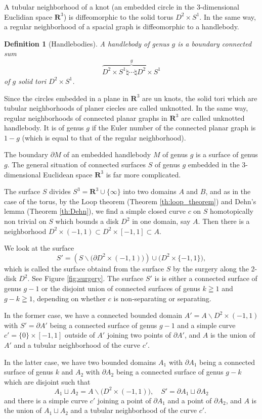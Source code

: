 \documentclass{amsart}
\newtheorem{definition}[theorem]{Definition}
\numberwithin{equation}{section}
\newcommand{\RR}{{\boldsymbol{R}}}
\newcommand{\bd}{\partial}
\newcommand{\ssm}{\smallsetminus}
\begin{document}
A tubular neighborhood of a knot (an embedded circle in the 3-dimensional Euclidian space $\RR^3$) is diffeomorphic to the solid torus $D^2\times S^1$. 
In the same way, a regular neighborhood of a spacial graph is diffeomorphic to a handlebody. 
\begin{definition}[Handlebodies]
A handlebody of genus $g$ is a boundary connected sum 
$$\overset{g}{\overbrace{D^2 \times S^1 \natural\cdots \natural D^2 \times S^1}}$$
of $g$ solid tori $D^2 \times S^1$. 
\end{definition}

Since the circles embedded in a plane in  $\RR^3$ are un knots, the solid tori which are tubular neighborhoods of planer ciecles are called unknotted.  
In the same way, regular neighborhoods of connected planar graphs in $\RR^3$ are called unknotted handlebody. It is of genus $g$ if the Euler number of the connected  planar graph is  $1-g$ (which is equal to that of the regular neighborhood). 

The boundary $\bd M$ of an embedded handlebody $M$ of genus $g$ is a surface of genus $g$. The general situation of connected surfaces $S$ of genus $g$ embedded in the 3-dimensional Euclidean space $\RR^3$ is far  more complicated.

The surface $S$ divides $S^3=\RR^3\cup\{\infty\}$ into two domains $A$ and $B$, and as in the case of the torus, by the Loop theorem (Theorem \ref{th:loop_theorem}) and Dehn's lemma (Theorem \ref{th:Dehn}), we find a simple closed curve $c$ on $S$ homotopically non trivial on $S$ which bounds a disk $D^2$ in one domain, say $A$. Then there is a neighborhood $D^2\times (-1,1)\subset D^2\times [-1,1] \subset A$.

We look at the surface 
$$S'=(S\ssm \big(\bd D^2\times (-1,1)\big)) \cup \big(D^2\times \{-1,1\}\big),$$
which is called the surface obtaind from the surface $S$ by the surgery along the 2-disk $D^2$. See Figure \ref{fig:surgery}. 
The surface $S'$ is
is either a connected surface of genus $g-1$ or the disjoint union of connected surfaces of genus
$k\geqq 1$ and $g-k\geqq 1$, depending on whether $c$ is non-separating or separating.

In the former case, we have a connected bounded domain $A'= A\ssm D^2\times (-1,1)$ with $S'=\bd A'$ being a connected surface of genus $g-1$ and a simple curve $c'=\{0\}\times [-1,1]$ outside of $A'$ joining two points of $\bd A'$, and $A$ is the union of $A'$ and a tubular neighborhood of the curve $c'$.

In the latter case, we have two bounded domains $A_1$ with $\bd A_1$ being a connected surface of genus $k$ and $A_2$ with $\bd A_2$ being a connected surface of genus $g-k$ which are disjoint such that $$A_1\sqcup A_2= A\ssm \big(D^2\times (-1,1)\big),\quad S'=\bd A_1\sqcup \bd A_2$$  and there is a simple curve $c'$ joining a point of $\bd A_1$ and a point of $\bd A_2$, and $A$ is the union of $A_1\sqcup A_2$ and a tubular neighborhood of the curve $c'$. 
\end{document}
